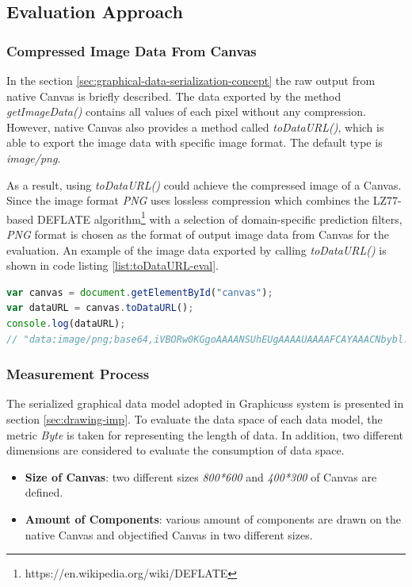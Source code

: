 
\subsection{Evaluation Approach}

\subsubsection{Compressed Image Data From Canvas}
In the section \ref{sec:graphical-data-serialization-concept} the raw output from native Canvas is briefly described. The data exported by the method \textit{getImageData()} contains all values of each pixel without any compression. However, native Canvas also provides a method called \textit{toDataURL()}, which is able to export the image data with specific image format. The default type is \textit{image/png}.

As a result, using \textit{toDataURL()} could achieve the compressed image  of a Canvas. Since the image format \textit{PNG} uses lossless compression which combines the LZ77-based DEFLATE algorithm\footnote{https://en.wikipedia.org/wiki/DEFLATE} with a selection of domain-specific prediction filters, \textit{PNG} format is chosen as the format of output image data  from Canvas for the evaluation. An example of the image data exported by calling \textit{toDataURL()} is shown in code listing \ref{list:toDataURL-eval}.


\begin{lstlisting}[language=JavaScript, caption=Example of image data while calling toDataURL() , label={list:toDataURL-eval}]
var canvas = document.getElementById("canvas");
var dataURL = canvas.toDataURL();
console.log(dataURL);
// "data:image/png;base64,iVBORw0KGgoAAAANSUhEUgAAAAUAAAAFCAYAAACNbybl...ADElEQVQImWNgoBMAAABpAAFEI8ARAAAAAElFTkSuQmCC"
\end{lstlisting}

\subsubsection{Measurement Process}
The serialized graphical data model adopted in Graphicuss system is presented in section \ref{sec:drawing-imp}. To evaluate the data space of each data model, the metric \textit{Byte} is taken for representing the length of data. In addition, two different dimensions are considered to evaluate the consumption of data space.

\begin{itemize}
  \item \textbf{Size of Canvas}: two different sizes \textit{800*600} and \textit{400*300} of Canvas are defined.
  \item \textbf{Amount of Components}: various amount of components are drawn on the native Canvas and objectified Canvas in two different sizes.
\end{itemize}

